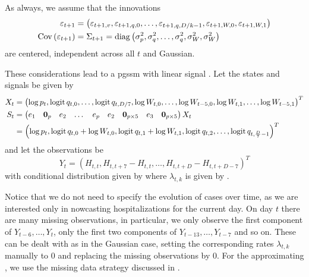As always, we assume that the innovations 
\begin{align*}
    \varepsilon_{t + 1} &= \left( \varepsilon_{t + 1, v}, \varepsilon_{t + 1, q,0}, \dots, \varepsilon_{t + 1, q, D / k - 1}, \varepsilon_{t + 1, W, 0}, \varepsilon_{t + 1, W, 1}  \right) \\
    \operatorname{Cov} \left( \varepsilon_{t + 1 } \right) &= \Sigma_{t + 1} = \operatorname{diag} \left( \sigma^{2}_p, \sigma^2_{q}, \dots, \sigma^{2}_q, \sigma^{2}_W , \sigma^{2}_{W}\right)
\end{align*} are centered, independent across all $t$ and Gaussian.

These considerations lead to a \acrshort{pgssm} with linear signal . Let the states and signals be given by 
\begin{align*}
   X_{t} &= \left( \log p_{t}, \operatorname{logit} q_{t,0}, \dots, \operatorname{logit} q_{t, D / 7}, \log W_{t, 0}, \dots, \log W_{t - 5, 0}, \log W_{t, 1}, \dots, \log W_{t - 5, 1} \right) ^{T} \\
   S_{t} &= \begin{pmatrix}
       e_{1} & \mathbf 0_{p} & e_{2} & \dots & e_{p} & e_{2} & \mathbf 0_{p \times 5} & e_{3} & \mathbf 0_{p \times 5}
   \end{pmatrix} X_{t} \\
   & = \left( \log p_{t}, \operatorname{logit} q_{t,0} + \log W_{t, 0}, \operatorname{logit} q_{t, 1} + \log W_{t, 1}, \operatorname{logit} q_{t, 2}, \dots, \operatorname{logit} q_{t, \frac{D}{7} - 1} \right)^{T}
\end{align*}
and let the observations be 
$$
    Y_{t} = \left( H_{t,t},  H_{t, t + 7} - H^{}_{t, t} , \dots, H_{t, t + D} - H^{}_{t, t + D - 7}\right)^{T}
$$
with conditional distribution given by  where $\lambda_{t,k}$ is given by .

Notice that we do not need to specify the evolution of cases over time, as we are interested only in nowcasting hospitalizations for the current day. 
On day $t$ there are many missing observations, in particular, we only observe the first component of $Y_{t - 6}, \dots, Y_{t}$, only the first two components of $Y_{t - 13}, \dots, Y_{t-7}$ and so on. These can be dealt with as in the Gaussian case, setting the corresponding rates $\lambda_{t,k}$ manually to $0$ and replacing the missing observations by $0$. For the approximating , we use the missing data strategy discussed in .

